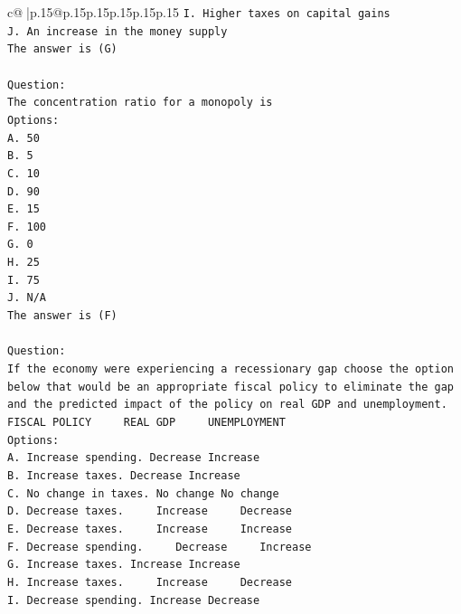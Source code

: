 \documentclass{article}
\begin{document}
{\begin{supertabular}{c@{$\;$}|p{.15\linewidth}@{}p{.15\linewidth}p{.15\linewidth}p{.15\linewidth}p{.15\linewidth}p{.15\linewidth}}
{{{\texttt{I. Higher taxes on capital gains} \\
\texttt{J. An increase in the money supply} \\
\texttt{The answer is (G)} \\
\\ 
\texttt{Question:} \\
\texttt{The concentration ratio for a monopoly is} \\
\texttt{Options:} \\
\texttt{A. 50} \\
\texttt{B. 5} \\
\texttt{C. 10} \\
\texttt{D. 90} \\
\texttt{E. 15} \\
\texttt{F. 100} \\
\texttt{G. 0} \\
\texttt{H. 25} \\
\texttt{I. 75} \\
\texttt{J. N/A} \\
\texttt{The answer is (F)} \\
\\ 
\texttt{Question:} \\
\texttt{If the economy were experiencing a recessionary gap choose the option below that would be an appropriate fiscal policy to eliminate the gap and the predicted impact of the policy on real GDP and unemployment. FISCAL POLICY ~~~ REAL GDP ~~~ UNEMPLOYMENT} \\
\texttt{Options:} \\
\texttt{A. Increase spending.    Decrease    Increase} \\
\texttt{B. Increase taxes.    Decrease    Increase} \\
\texttt{C. No change in taxes.    No change    No change} \\
\texttt{D. Decrease taxes. ~~~ Increase ~~~ Decrease} \\
\texttt{E. Decrease taxes. ~~~ Increase ~~~ Increase} \\
\texttt{F. Decrease spending. ~~~ Decrease ~~~ Increase} \\
\texttt{G. Increase taxes.    Increase    Increase} \\
\texttt{H. Increase taxes. ~~~ Increase ~~~ Decrease} \\
\texttt{I. Decrease spending.    Increase    Decrease} \\
            }
        }
    }
     \\ \\


\end{supertabular}}
\end{document}
